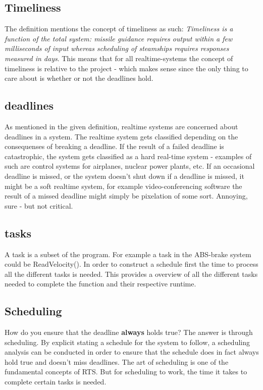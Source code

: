 \subsection{Timeliness}
The definition mentions the concept of timeliness as such: \textit{Timeliness
is a function of the total system: missile guidance requires output within a
few milliseconds of input whereas scheduling of steamships requires responses measured in days}. This means that for all realtime-systems the
concept of timeliness is relative to the project - which makes sense since the only thing to care about is whether or not the deadlines hold.
\subsection{deadlines}
As mentioned in the given definition, realtime systems are concerned about deadlines in a system.
The realtime system gets classified depending on the consequenses of breaking a deadline. If the result of a failed deadline
is catastrophic, the system gets classified as a hard real-time system - examples of such are control systems for airplanes, nuclear power plants, etc.
If an occasional deadline is missed, or the system doesn't shut down if a deadline is missed, it might be a soft realtime system, for example video-conferencing software
the result of a missed deadline might simply be pixelation of some sort. Annoying, sure - but not critical.
\subsection{tasks}
A task is a subset of the program. For example a task in the ABS-brake system could be ReadVelocity(). In order to construct a schedule first
the time to process all the different tasks is needed. This provides a overview of all the different tasks needed to complete the function and their
respective runtime.
\subsection{Scheduling}
How do you ensure that the deadline \textbf{always} holds true? The answer is through scheduling. By explicit stating a schedule for the system to follow,
a scheduling analysis can be conducted in order to ensure that the schedule does in fact always hold true and doesn't miss deadlines. The art of scheduling
is one of the fundamental concepts of RTS. But for scheduling to work, the time it takes to complete certain tasks is needed.
%
%
%
%
%
%
%
